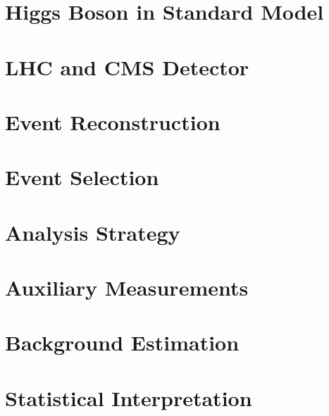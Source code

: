 \documentclass[12pt,chapterheads]{ucsd}
\begin{document}
%






%
\chapter{Higgs Boson in Standard Model}
\label{ch:intro_higgs}


%
\chapter{LHC and CMS Detector}
\label{ch:lhc_cms}


%
\chapter{Event Reconstruction}
\label{ch:event_reconstruction}


%
\chapter{Event Selection}
\label{ch:event_selection}


%
\chapter{Analysis Strategy}
\label{ch:analysis_strategy}


%
\chapter{Auxiliary Measurements}
\label{ch:auxiliary_measurement}


%
\chapter{Background Estimation}
\label{ch:background_estimation}


%
\chapter{Statistical Interpretation}
\label{ch:stat_interpret}

\end{document}
